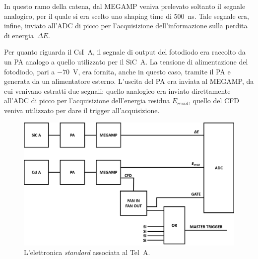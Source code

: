 In questo ramo della catena, dal MEGAMP veniva prelevato soltanto il segnale analogico, per il quale si era scelto uno shaping time di 500~ns.
Tale segnale era, infine, inviato all'ADC di picco per l'acquisizione dell'informazione sulla perdita di energia~$\Delta E$.
%

Per quanto riguarda il CsI~A, il segnale di output del fotodiodo era raccolto da un PA analogo a quello utilizzato per il SiC~A.
La tensione di alimentazione del fotodiodo, pari a $-70$~V, era fornita, anche in questo caso, tramite il PA e generata da un alimentatore esterno.
L'uscita del PA era inviata al MEGAMP, da cui venivano estratti due segnali: quello analogico era inviato direttamente all'ADC di picco per l'acquisizione dell'energia residua $E_{resid}$, quello del CFD veniva utilizzato per dare il trigger all'acquisizione.

\begin{figure} [!p]
	\centering
	\includegraphics[width=\textwidth, keepaspectratio]{Grafici/elettronica_standard.png}
	\caption{L'elettronica \emph{standard} associata al Tel~A.} \label{fig:elettronica_standard}
\end{figure}



